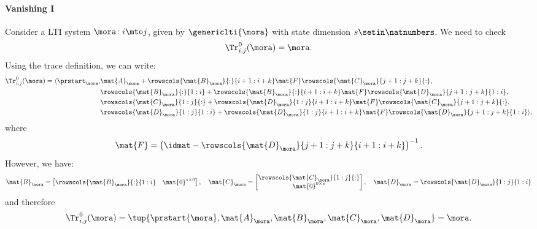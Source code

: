 {\begin{example}
        \paragraph*{Vanishing I}
        Consider a LTI system $\mora\colon i\mto j$, given by $\genericlti{\mora}$ with state dimension $s\setin \natnumbers$.
        We need to check
        \begin{equation*}
            \Tr_{i,j}^0 (\mora)=\mora.
        \end{equation*}
        Using the trace definition, we can write:
        \begin{equation*}
            \begin{aligned}
                \Tr_{i,j}^0 (\mora)=\langle\prstart_{\mora}, & \mat{A}_\mora+\rowscols{\mat{B}_{\mora}}{:}{i+1:i+k}\mat{F}\rowscols{\mat{C}_{\mora}}{j+1:j+k}{:}, \\
                                                             & \rowscols{\mat{B}_{\mora}}{:}{1:i}+ \rowscols{\mat{B}_{\mora}}{:}{i+1:i+k}\mat{F}\rowscols{\mat{D}_{\mora}}{j+1:j+k}{1:i}, \\
                                                             & \rowscols{\mat{C}_{\mora}}{1:j}{:}+\rowscols{\mat{D}_{\mora}}{1:j}{i+1:i+k}\mat{F}\rowscols{\mat{C}_{\mora}}{j+1:j+k}{:}, \\
                                                             & \rowscols{\mat{D}_{\mora}}{1:j}{1:i}+ \rowscols{\mat{D}_{\mora}}{1:j}{i+1:i+k}\mat{F}\rowscols{\mat{D}_{\mora}}{j+1:j+k}{1:i}\rangle,
            \end{aligned}
        \end{equation*}
        where
        \begin{equation*}
            \mat{F}=\left(\idmat - \rowscols{\mat{D}_{\mora}}{j+1:j+k}{i+1:i+k}\right)^{-1}.
        \end{equation*}
        However, we have:
        \begin{equation*}
            \mat{B}_\mora=\begin{bmatrix}
                \rowscols{\mat{B}_{\mora}}{:}{1:i} & \mat{0}^{s\times 0}
            \end{bmatrix},\quad
            \mat{C}_\mora=\begin{bmatrix}
                \rowscols{\mat{C}_{\mora}}{1:j}{:} \\ \mat{0}^{0\times s}
            \end{bmatrix},
            \quad
            \mat{D}_\mora= \rowscols{\mat{D}_\mora}{1:j}{1:i}
        \end{equation*}
        and therefore
        \begin{equation*}
            \Tr_{i,j}^0 (\mora)=\tup{\prstart{\mora}, \mat{A}_\mora, \mat{B}_\mora, \mat{C}_\mora, \mat{D}_\mora}=\mora.
        \end{equation*}


\end{example}}

